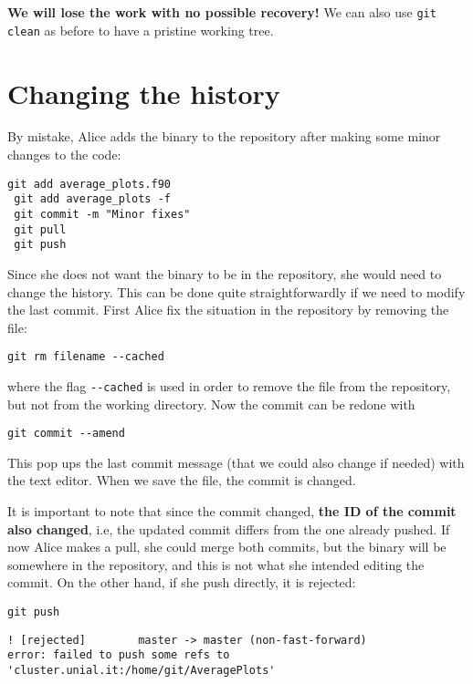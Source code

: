 \documentclass[a4paper,10pt]{article}
\begin{document}
\textbf{We will lose the work with no possible recovery!} We can also use \texttt{git clean} as before to have a pristine working tree.

\clearpage

\section{Changing the history}

By mistake, Alice adds the binary to the repository after making some minor changes to the code:

\begin{lstlisting}[style=Alice]
 git add average_plots.f90
 git add average_plots -f
 git commit -m "Minor fixes"
 git pull
 git push
\end{lstlisting}

Since she does not want the binary to be in the repository, she would need to change the history.  This can be done quite straightforwardly if we need to modify the last commit. First Alice fix the situation in the repository by removing the file:

\begin{lstlisting}[style=Alice]
 git rm filename --cached
\end{lstlisting}
where the flag \texttt{-{}-cached} is used in order to remove the file from the repository, but not from the working directory. Now the commit can be redone with

\begin{lstlisting}[style=Alice]
 git commit --amend
\end{lstlisting}
This pop ups the last commit message (that we could also change if needed) with the text editor. When we save the file, the commit is changed.

It is important to note that since the commit changed, \textbf{the ID of the commit also changed}, i.e, the updated commit differs from the one already pushed. If now Alice makes a pull, she could merge both commits, but the binary will be somewhere in the repository, and this is not what she intended editing the commit. On the other hand, if she push directly, it is rejected:

\begin{lstlisting}[style=Alice]
 git push
\end{lstlisting}
\begin{lstlisting}[style=Output]
 ! [rejected]        master -> master (non-fast-forward)
error: failed to push some refs to 'cluster.unial.it:/home/git/AveragePlots'
\end{lstlisting}
\end{document}
